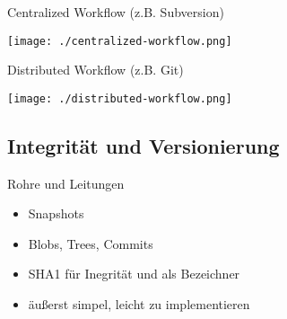 \begin{frame}{Centralized Workflow (z.B. Subversion)}
    \centerline{\texttt{[image: ./centralized-workflow.png]}}
\end{frame}

\begin{frame}{Distributed Workflow (z.B. Git)}
    \centerline{\texttt{[image: ./distributed-workflow.png]}}
\end{frame}

\subsection{Integrität und Versionierung}

\begin{frame}{Rohre und Leitungen}
    \begin{itemize}[<+->]
        \item Snapshots
        \item Blobs, Trees, Commits
        \item SHA1 für Inegrität und als Bezeichner
        \item äußerst simpel, leicht zu implementieren
    \end{itemize}
\end{frame}



